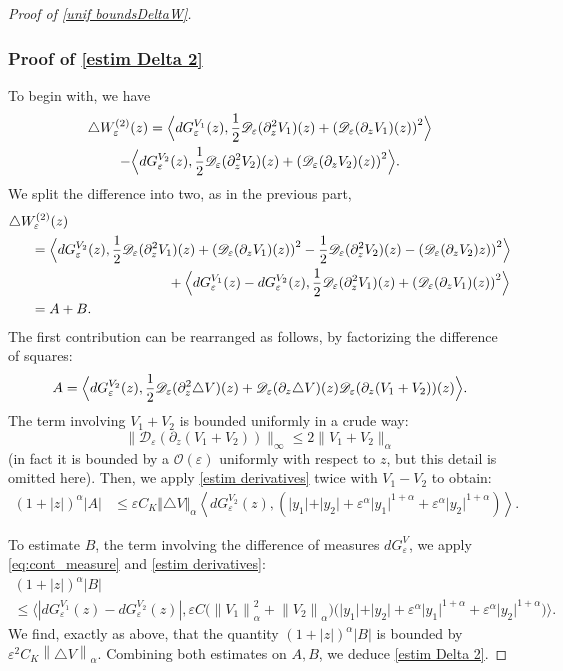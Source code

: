 \documentclass[10pt]{amsart}
\let\mathcal\mathscr
\newcommand{\cO}{\mathcal{O}}
\theoremstyle{plain}
\theoremstyle{definition}
\newcommand{\D}{\mathcal{D}_\eps}
\let\eps\varepsilon
\let\ds\displaystyle
\newcommand{\abs}[1]{\left\lvert#1\right\rvert}
\newcommand{\norm}[1]{\left\lVert#1\right\rVert}
\newcommand{\nalph}[1]{\left\lVert#1\right\rVert_\alpha}
\newcommand{\QV}{G_\eps^V}
\newcommand{\dQVA}{dG_\eps^{V_1}}
\newcommand{\dQVB}{dG_\eps^{V_2}}
\begin{document}
\begin{proof}[Proof of \cref{unif boundsDeltaW}]
\subsubsection*{Proof of \eqref{estim Delta 2}}
To begin with, we have
\begin{multline*}
\triangle W_\eps^{(2)}(z) =
\Bigl\langle \dQVA(z), \dfrac{1}{2} \D(\partial_z^2 V_1)(z) + \left(\D(\partial_z V_1)(z)\right)^2 \Bigr\rangle \\
-\Bigl\langle \dQVB(z), \dfrac{1}{2} \D(\partial_z^2 V_2)(z) + \left(\D(\partial_z V_2)(z)\right)^2 \Bigr\rangle.
\end{multline*}
We split the difference into two, as in the previous part,
\begin{align*}
\triangle W_\eps^{(2)}&(z)\\
& \hspace*{-5mm}=
\Bigl\langle \dQVB(z), \dfrac{1}{2} \D(\partial_z^2 V_1)(z) + \left(\D(\partial_z V_1)(z)\right)^2
- \dfrac{1}{2} \D(\partial_z^2 V_2)(z) - \left(\D(\partial_z V_2)z)\right)^2 \Bigr\rangle
\\
&\hspace*{3cm} + \Bigl\langle \dQVA(z)-\dQVB(z), \dfrac{1}{2} \D(\partial_z^2 V_1)(z) + \left(\D(\partial_z V_1)(z)\right)^2 \Bigr\rangle \\
&\hspace*{-5mm}= A + B.
\end{align*}
The first contribution can be rearranged as follows, by factorizing the difference of squares:
\begin{equation*}
A
= \Bigl\langle \dQVB(z),\dfrac{1}{2} \D(\partial_z^2 \triangle V)(z)
+ \D(\partial_z \triangle V)(z) \D(\partial_z (V_1+V_2))(z)
\Bigr\rangle.
\end{equation*}
The term involving $V_1+V_2$ is bounded uniformly in a crude way: $$\|\D(\partial_z (V_1+V_2))\|_\infty \leq 2 \|V_1+V_2\|_\alpha$$ (in fact it is bounded by a $\cO(\eps)$ uniformly with respect to $z$, but this detail is omitted here).
Then, we apply \cref{estim derivatives} twice with $V_1-V_2$ to obtain:
\begin{align*}
\ds (1+\abs{z})^\alpha \abs{A} & \leq \eps C_K \Vert \triangle V \Vert_\alpha \left\langle \dQVB(z), \left(\vert y_1 \vert+ \vert y_2 \vert +\eps^\alpha \vert y_1 \vert^{1+\alpha} + \eps^\alpha\vert y_2 \vert^{1+\alpha} \right) \right\rangle.
\end{align*}

To estimate $B$, the term involving the difference of measures $d\QV$, we apply \eqref{eq:cont_measure} and \cref{estim derivatives}:
\begin{multline}\label{eq:estim PSI}
(1+\abs{z})^\alpha \abs{B}\\
\leq \bigl\langle \abs{\dQVA(z)-\dQVB(z) }, \eps C \bigl (\norm{V_1}_\alpha^2 + \nalph{V_2} \bigr)\bigl(\vert y_1 \vert+ \vert y_2 \vert + \eps^\alpha\vert y_1 \vert^{1+\alpha} + \eps^\alpha\vert y_2 \vert^{1+\alpha} \bigr) \bigr\rangle.
\end{multline}
We find, exactly as above, that the quantity $(1+\abs{z})^\alpha \abs{B} $ is bounded by $\eps^2 C_K \norm{\triangle V}_\alpha$.
Combining both estimates on $A,B$, we deduce \cref{estim Delta 2}.


\end{proof}
\end{document}
